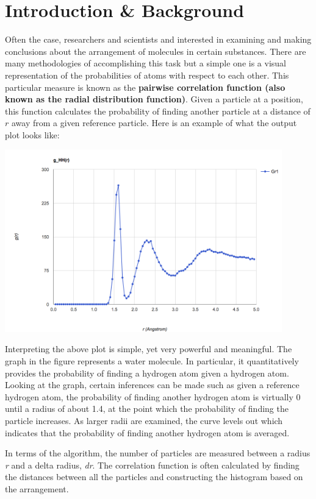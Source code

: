 \section*{Introduction \& Background}

Often the case, researchers and scientists and interested in examining and making conclusions about the arrangement of molecules in certain substances. There are many methodologies of accomplishing this task but a simple one is a visual representation of the probabilities of atoms with respect to each other.
This particular measure is known as the \textbf{pairwise correlation function (also known as the radial distribution function)}. Given a particle at a position, this function calculates the probability of finding another particle at a distance of $r$ away from a given reference particle. Here is an example of what the output plot looks like:

\includegraphics[width=0.90\textwidth]{sample_plot}

Interpreting the above plot is simple, yet very powerful and meaningful. The graph in the figure represents a water molecule. In particular, it quantitatively provides the probability of finding a hydrogen atom given a hydrogen atom. Looking at the graph, certain inferences can be made such as given a reference hydrogen atom, the probability of finding another hydrogen atom is virtually 0 until a radius of about 1.4, at the point which the probability of finding the particle increases. As larger radii are examined, the curve levels out which indicates that the probability of finding another hydrogen atom is averaged. 


In terms of the algorithm, the number of particles are measured between a radius \textit{r} and a delta radius, \textit{dr}. The correlation function is often calculated by finding the distances between all the particles and constructing the histogram based on the arrangement.

